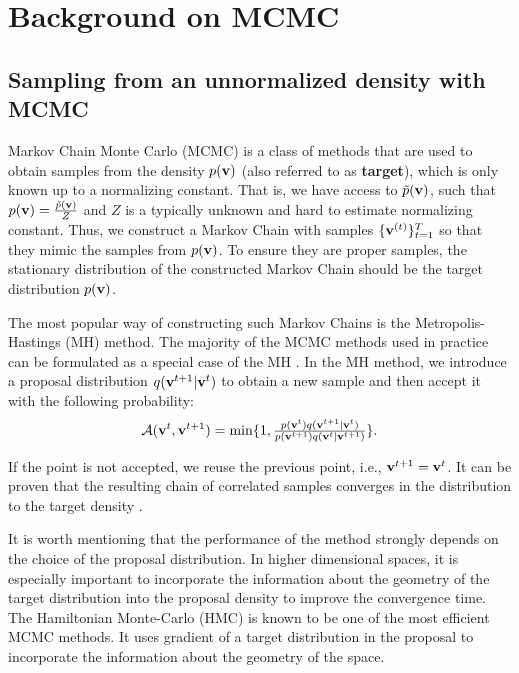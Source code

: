 
\newpage
\section{Background on MCMC}\label{appendix:background}

\subsection{Sampling from an unnormalized density with MCMC}
Markov Chain Monte Carlo (MCMC) is a class of methods that are used to obtain samples from the density $p({\mathbf{v}})$ (also referred to as \textbf{target}), which is only known up to a normalizing constant. That is, we have access to $\tilde{p}({\mathbf{v}})$, such that $p({\mathbf{v}}) = \frac{\tilde{p}({\mathbf{v}})}{Z}$ and $Z$ is a typically unknown and hard to estimate normalizing constant. Thus, we construct a Markov Chain with samples $\{{\mathbf{v}}^{(t)}\}_{t=1}^T$ so that they mimic the samples from $p({\mathbf{v}})$. To ensure they are proper samples, the stationary distribution of the constructed Markov Chain should be the target distribution $p({\mathbf{v}})$.

The most popular way of constructing such Markov Chains is the Metropolis-Hastings (MH) method. The majority of the MCMC methods used in practice can be formulated as a special case of the MH \cite{andrieu2003introduction}. In the MH method, we introduce a proposal distribution $q({\mathbf{v}}^{t+1}|{\mathbf{v}}^t)$ to obtain a new sample and then accept it with the following probability:
\begin{equation}\label{eq:accept}
\mathcal{A}(\rvv^t, \rvv^{t+1})= \min\{ 1, \tfrac{p(\rvv^t)q(\rvv^{t+1}|\rvv^{t})}{p(\rvv^{t+1})q(\rvv^{t}|\rvv^{t+1})} \} .    
\end{equation}

If the point is not accepted, we reuse the previous point, i.e., ${\mathbf{v}}^{t+1} = {\mathbf{v}}^{t}$. It can be proven that the resulting chain of correlated samples converges in the distribution to the target density \cite{andrieu2003introduction}. 

It is worth mentioning that the performance of the method strongly depends on the choice of the proposal distribution. In higher dimensional spaces, it is especially important to incorporate the information about the geometry of the target distribution into the proposal density to improve the convergence time. The Hamiltonian Monte-Carlo (HMC) \cite{neal2011mcmc} is known to be one of the most efficient MCMC methods. It uses gradient of a target distribution in the proposal to incorporate the information about the geometry of the space.

